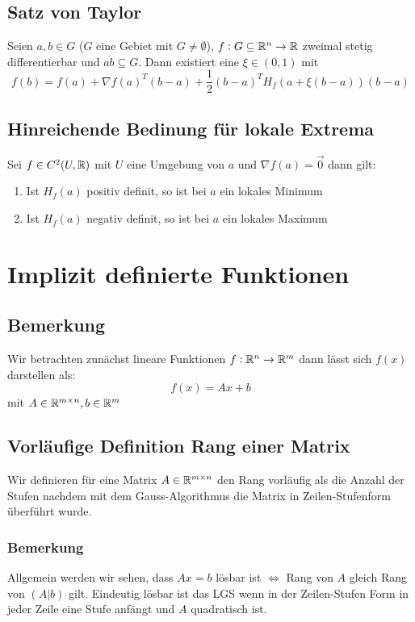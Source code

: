 \subsection{Satz von Taylor}
Seien $a, b \in G$ ($G$ eine Gebiet mit $G \neq \emptyset$), $f: G \subseteq \mathbb{R}^n
\rightarrow \mathbb{R}$ zweimal stetig differentierbar und $\overline{ab} \subseteq G$.
Dann existiert eine $\xi \in (0,1)$ mit
\begin{equation*}
    f(b) = f(a) + \nabla {f(a)}^T (b-a) + \frac{1}{2} {(b-a)}^T H_f(a+ \xi (b-a))
    (b-a)
\end{equation*}

\subsection{Hinreichende Bedinung für lokale Extrema}
Sei $f \in C^2(U, \mathbb{R})$ mit $U$ eine Umgebung von $a$ und $\nabla f(a) = \vec{0}$
dann gilt:
\begin{enumerate}[label= (\alph*)]
    \item Ist $H_f(a)$ positiv definit, so ist bei $a$ ein lokales Minimum
    \item Ist $H_f(a)$ negativ definit, so ist bei $a$ ein lokales Maximum
\end{enumerate}

\section{Implizit definierte Funktionen}
\subsection{Bemerkung}
Wir betrachten zunächst lineare Funktionen $f: \mathbb{R}^n \rightarrow \mathbb{R}^m$ dann lässt
sich  $f(x)$ darstellen als:
\begin{equation*}
    f(x) = A x + b
\end{equation*}
mit $A \in \mathbb{R}^{m \times n}, b \in \mathbb{R}^m$

\subsection{Vorläufige Definition Rang einer Matrix}
Wir definieren für eine Matrix $A \in \mathbb{R}^{m \times n}$ den Rang vorläufig als
die Anzahl der Stufen nachdem mit dem Gauss-Algorithmus die Matrix in
Zeilen-Stufenform überführt wurde.

\subsubsection{Bemerkung}
Allgemein werden wir sehen, dass $A x = b$ lösbar ist $\Leftrightarrow$ Rang von
$A$ gleich Rang von $(A \vert b)$ gilt. Eindeutig lösbar ist das LGS wenn in der
Zeilen-Stufen Form in jeder Zeile eine Stufe anfängt und $A$ quadratisch ist.

